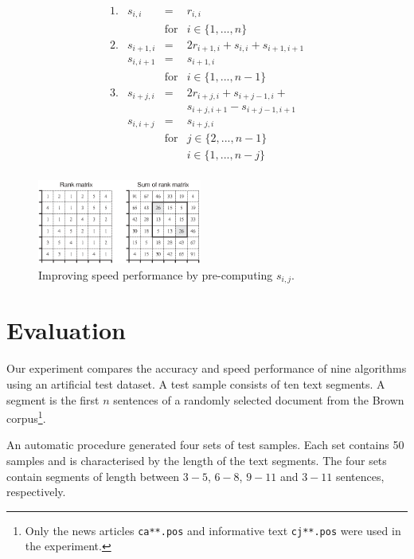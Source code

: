 \documentclass[11pt]{article}
\begin{document}
\begin{equation}
\begin{array}{llcl}
1. & s_{i,i} & = & r_{i,i} \\
   &         & \textrm{for}  & i \in \{1,...,n\} \\
2. & s_{i+1,i} & = & 2 r_{i+1,i} + s_{i,i} + s_{i+1,i+1} \\
   & s_{i,i+1} & = & s_{i+1,i} \\
   &           & \textrm{for} & i \in \{1,...,n-1\} \\
3. & s_{i+j,i} & = & 2 r_{i+j,i} + s_{i+j-1,i} + \\
   &           &   & s_{i+j,i+1} - s_{i+j-1,i+1} \\
   & s_{i,i+j} & = & s_{i+j,i} \\
   &           & \textrm{for} & j \in \{2,...,n-1\} \\
   &           &   & i \in \{1,...,n-j\} \\
\end{array}
\label{eq:sumrank}
\end{equation}

\begin{figure}[h]
\begin{center}
\includegraphics[width=0.48\textwidth]{ranksum.eps}
\end{center}
\caption{Improving speed performance by pre-computing $s_{i,j}$.}
\label{fig:sumrank}
\end{figure}

\section{Evaluation}
Our experiment compares the accuracy and speed performance of nine algorithms using an artificial test dataset. A test sample consists of ten text segments. A segment is the first $n$ sentences of a randomly selected document from the Brown corpus\footnote{Only the news articles {\tt ca**.pos} and informative text {\tt cj**.pos} were used in the experiment.}.

An automatic procedure generated four sets of test samples. Each set contains 50 samples and is characterised by the length of the text segments. The four sets contain segments of length between $3-5$, $6-8$, $9-11$ and $3-11$ sentences, respectively.
\end{document}
